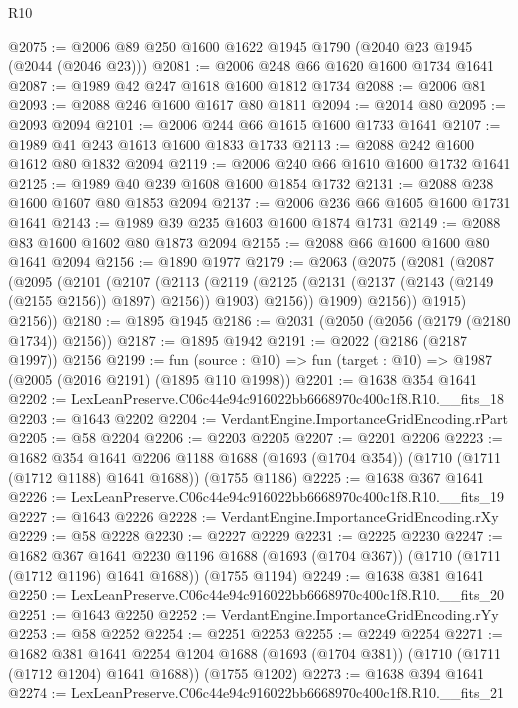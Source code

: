 \begin{lexlean}{R10}
\begin{coremodule}
@2075 := @2006 @89 @250 @1600 @1622 @1945 @1790 (@2040 @23 @1945 (@2044 (@2046 @23)))
@2081 := @2006 @248 @66 @1620 @1600 @1734 @1641
@2087 := @1989 @42 @247 @1618 @1600 @1812 @1734
@2088 := @2006 @81
@2093 := @2088 @246 @1600 @1617 @80 @1811
@2094 := @2014 @80
@2095 := @2093 @2094
@2101 := @2006 @244 @66 @1615 @1600 @1733 @1641
@2107 := @1989 @41 @243 @1613 @1600 @1833 @1733
@2113 := @2088 @242 @1600 @1612 @80 @1832 @2094
@2119 := @2006 @240 @66 @1610 @1600 @1732 @1641
@2125 := @1989 @40 @239 @1608 @1600 @1854 @1732
@2131 := @2088 @238 @1600 @1607 @80 @1853 @2094
@2137 := @2006 @236 @66 @1605 @1600 @1731 @1641
@2143 := @1989 @39 @235 @1603 @1600 @1874 @1731
@2149 := @2088 @83 @1600 @1602 @80 @1873 @2094
@2155 := @2088 @66 @1600 @1600 @80 @1641 @2094
@2156 := @1890 @1977
@2179 := @2063
    (@2075
      (@2081
        (@2087
          (@2095
            (@2101
              (@2107
                (@2113
                  (@2119
                    (@2125 (@2131 (@2137 (@2143 (@2149 (@2155 @2156)) @1897) @2156)) @1903)
                    @2156))
                @1909)
              @2156))
          @1915)
        @2156))
@2180 := @1895 @1945
@2186 := @2031 (@2050 (@2056 (@2179 (@2180 @1734)) @2156))
@2187 := @1895 @1942
@2191 := @2022 (@2186 (@2187 @1997)) @2156
@2199 := fun (source : @10) => fun (target : @10) => @1987 (@2005 (@2016 @2191) (@1895 @110 @1998))
@2201 := @1638 @354 @1641
@2202 := LexLeanPreserve.C06c44e94c916022bb6668970c400c1f8.R10.__fits_18
@2203 := @1643 @2202
@2204 := VerdantEngine.ImportanceGridEncoding.rPart
@2205 := @58 @2204
@2206 := @2203 @2205
@2207 := @2201 @2206
@2223 := @1682
    @354
    @1641
    @2206
    @1188
    @1688
    (@1693 (@1704 @354))
    (@1710 (@1711 (@1712 @1188) @1641 @1688))
    (@1755 @1186)
@2225 := @1638 @367 @1641
@2226 := LexLeanPreserve.C06c44e94c916022bb6668970c400c1f8.R10.__fits_19
@2227 := @1643 @2226
@2228 := VerdantEngine.ImportanceGridEncoding.rXy
@2229 := @58 @2228
@2230 := @2227 @2229
@2231 := @2225 @2230
@2247 := @1682
    @367
    @1641
    @2230
    @1196
    @1688
    (@1693 (@1704 @367))
    (@1710 (@1711 (@1712 @1196) @1641 @1688))
    (@1755 @1194)
@2249 := @1638 @381 @1641
@2250 := LexLeanPreserve.C06c44e94c916022bb6668970c400c1f8.R10.__fits_20
@2251 := @1643 @2250
@2252 := VerdantEngine.ImportanceGridEncoding.rYy
@2253 := @58 @2252
@2254 := @2251 @2253
@2255 := @2249 @2254
@2271 := @1682
    @381
    @1641
    @2254
    @1204
    @1688
    (@1693 (@1704 @381))
    (@1710 (@1711 (@1712 @1204) @1641 @1688))
    (@1755 @1202)
@2273 := @1638 @394 @1641
@2274 := LexLeanPreserve.C06c44e94c916022bb6668970c400c1f8.R10.__fits_21

\end{coremodule}
\end{lexlean}
